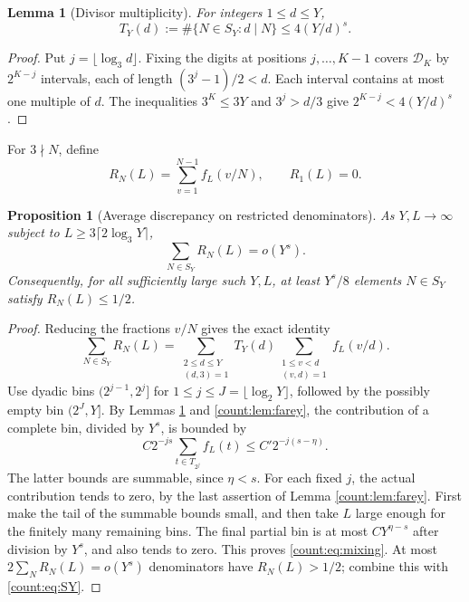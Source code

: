 \documentclass[11pt]{article}
\newtheorem{lemma}[theorem]{Lemma}
\newtheorem{proposition}[theorem]{Proposition}
\theoremstyle{remark}
\newcommand{\D}{\mathcal D}
\begin{document}
\begin{lemma}[Divisor multiplicity]\label{count:lem:divisors}
For integers $1\le d\le Y$,
\[
 T_Y(d):=\#\{N\in S_Y:d\mid N\}\le4(Y/d)^s.
\]
\end{lemma}
\begin{proof}
Put $j=\lfloor\log_3d\rfloor$. Fixing the digits at positions
$j,\ldots,K-1$ covers $\D_K$ by $2^{K-j}$ intervals, each of length
$(3^j-1)/2<d$. Each interval contains at most one multiple of $d$.
The inequalities $3^K\le3Y$ and $3^j>d/3$ give
$2^{K-j}<4(Y/d)^s$.
\end{proof}

For $3\nmid N$, define
\[
 R_N(L)=\sum_{v=1}^{N-1}f_L(v/N),\qquad R_1(L)=0.
\]

\begin{proposition}[Average discrepancy on restricted denominators]
\label{count:prop:mixing}
As $Y,L\to\infty$ subject to $L\ge3\lceil2\log_3Y\rceil$,
\begin{equation}\label{count:eq:mixing}
 \sum_{N\in S_Y}R_N(L)=o(Y^s).
\end{equation}
Consequently, for all sufficiently large such $Y,L$, at least
$Y^s/8$ elements $N\in S_Y$ satisfy $R_N(L)\le1/2$.
\end{proposition}
\begin{proof}
Reducing the fractions $v/N$ gives the exact identity
\[
 \sum_{N\in S_Y}R_N(L)
 =\sum_{\substack{2\le d\le Y\\(d,3)=1}}
   T_Y(d)\sum_{\substack{1\le v<d\\(v,d)=1}}f_L(v/d).
\]
Use dyadic bins $(2^{j-1},2^j]$ for $1\le j\le J=\lfloor\log_2Y\rfloor$,
followed by the possibly empty bin $(2^J,Y]$. By Lemmas
\ref{count:lem:divisors} and \ref{count:lem:farey}, the contribution of a complete
bin, divided by $Y^s$, is bounded by
\[
 C2^{-js}\sum_{t\in T_{2^j}}f_L(t)
 \le C'2^{-j(s-\eta)}.
\]
The latter bounds are summable, since $\eta<s$. For each fixed $j$,
the actual contribution tends to zero, by the last assertion of
Lemma \ref{count:lem:farey}. First make the tail of the summable bounds small,
and then take $L$ large enough for the finitely many remaining bins.
The final partial bin is at most $CY^{\eta-s}$ after division by $Y^s$,
and also tends to zero. This proves \eqref{count:eq:mixing}.
At most $2\sum_NR_N(L)=o(Y^s)$ denominators have $R_N(L)>1/2$;
combine this with \eqref{count:eq:SY}.
\end{proof}
\end{document}

